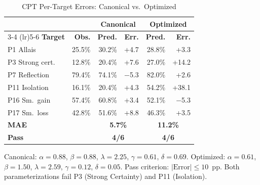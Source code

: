\documentclass[journal]{IEEEtran}
\begin{document}
\begin{table}[!h]
\renewcommand{\arraystretch}{1.15}
\caption{CPT Per-Target Errors: Canonical vs.\ Optimized}
\label{tab:cpt_detail}
\centering
\begin{tabular}{l r r r r r}
\toprule
& & \multicolumn{2}{c}{\textbf{Canonical}} & \multicolumn{2}{c}{\textbf{Optimized}} \\
\cmidrule(lr){3-4} \cmidrule(lr){5-6}
\textbf{Target} & \textbf{Obs.} & \textbf{Pred.} & \textbf{Err.} & \textbf{Pred.} & \textbf{Err.} \\
\midrule
P1 Allais       & 25.5\% & 30.2\% & +4.7  & 28.8\% & +3.3  \\
P3 Strong cert.  & 12.8\% & 20.4\% & +7.6  & 27.0\% & +14.2 \\
P7 Reflection   & 79.4\% & 74.1\% & $-$5.3 & 82.0\% & +2.6  \\
P11 Isolation   & 16.1\% & 20.4\% & +4.3  & 54.2\% & +38.1 \\
P16 Sm.\ gain   & 57.4\% & 60.8\% & +3.4  & 52.1\% & $-$5.3 \\
P17 Sm.\ loss   & 42.8\% & 51.6\% & +8.8  & 46.3\% & +3.5  \\
\midrule
\textbf{MAE}    &        & \multicolumn{2}{c}{\textbf{5.7\%}} & \multicolumn{2}{c}{\textbf{11.2\%}} \\
\textbf{Pass}   &        & \multicolumn{2}{c}{\textbf{4/6}}   & \multicolumn{2}{c}{\textbf{4/6}}   \\
\bottomrule
\end{tabular}
\begin{flushleft}
\footnotesize{Canonical: $\alpha=0.88$, $\beta=0.88$, $\lambda=2.25$, $\gamma=0.61$, $\delta=0.69$.
Optimized: $\alpha=0.61$, $\beta=1.50$, $\lambda=2.59$, $\gamma=0.12$, $\delta=0.05$.
Pass criterion: $|\text{Error}| \leq 10$~pp.
Both parameterizations fail P3 (Strong Certainty) and P11 (Isolation).}
\end{flushleft}
\end{table}

\end{document}
